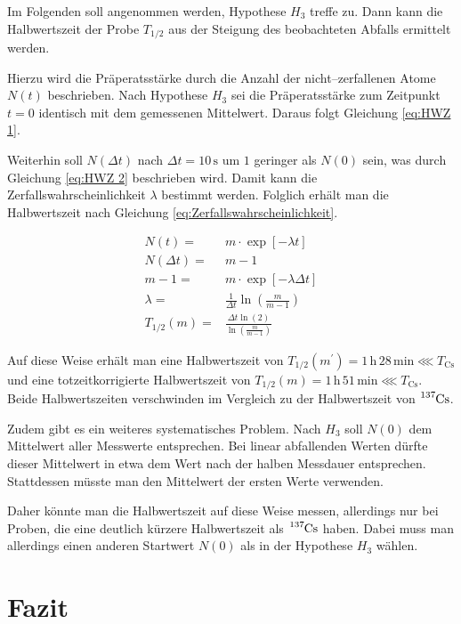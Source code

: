 \documentclass[12pt,a4paper]{scrartcl}
\numberwithin{equation}{section} %
\renewcommand{\[}{} %
\renewcommand{\]}{\noindent} %
\begin{document}
Im Folgenden soll angenommen werden, Hypothese $H_3$ treffe zu. Dann kann die Halbwertszeit der Probe $T_{1/2}$ aus der Steigung des beobachteten Abfalls ermittelt werden.

Hierzu wird die Präperatsstärke durch die Anzahl der nicht--zerfallenen Atome $N(t)$ beschrieben. Nach Hypothese $H_3$ sei die Präperatsstärke zum Zeitpunkt $t=0$ identisch mit dem gemessenen Mittelwert. Daraus folgt Gleichung \eqref{eq:HWZ 1}.

Weiterhin soll $N(\Delta t)$ nach $\Delta t=10\mathrm{\,s}$ um $1$ geringer als $N(0)$ sein, was durch Gleichung \eqref{eq:HWZ 2} beschrieben wird. Damit kann die Zerfallswahrscheinlichkeit $\lambda$ bestimmt werden. Folglich erhält man die Halbwertszeit nach Gleichung \eqref{eq:Zerfallswahrscheinlichkeit}.

\begin{align}
	N(t) =& m \cdot \exp[-\lambda t] \label{eq:HWZ 1}\\
	N(\Delta t) =& m-1 \\
	m-1 =& m \cdot \exp[-\lambda \Delta t] \label{eq:HWZ 2}\\
	\lambda =& \frac{1}{\Delta t} \ln(\frac{m}{m-1}) \\
	T_{1/2}(m) =& \frac{\Delta t \ln(2)}{\ln(\frac{m}{m-1})}
\end{align}

\noindent
Auf diese Weise erhält man eine Halbwertszeit von $T_{1/2}(m^\prime)=1\,\mathrm{h}\,28\,\mathrm{min}\lll T_\mathrm{Cs}$ und eine totzeitkorrigierte Halbwertszeit von $T_{1/2}(m)=1\,\mathrm{h}\,51\,\mathrm{min}\lll T_\mathrm{Cs}$. Beide Halbwertszeiten verschwinden im Vergleich zu der Halbwertszeit von $\ce{^{137}Cs}$.

Zudem gibt es ein weiteres systematisches Problem. Nach $H_3$ soll $N(0)$ dem Mittelwert aller Messwerte entsprechen. Bei linear abfallenden Werten dürfte dieser Mittelwert in etwa dem Wert nach der halben Messdauer entsprechen. Stattdessen müsste man den Mittelwert der ersten Werte verwenden.

Daher könnte man die Halbwertszeit auf diese Weise messen, allerdings nur bei Proben, die eine deutlich kürzere Halbwertszeit als $\ce{^{137}Cs}$ haben. Dabei muss man allerdings einen anderen Startwert $N(0)$ als in der Hypothese $H_3$ wählen.

\clearpage
\hypertarget{fazit}{%
\section{Fazit}\label{fazit}}
\end{document}
